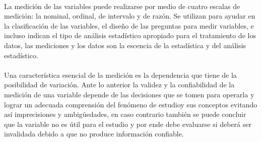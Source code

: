 \documentclass[12pt,hidelinks]{article}
\begin{document}
	\paragraph{}La medición de las variables puede realizarse por medio de cuatro escalas de medición: la nominal, ordinal, de intervalo y de razón. Se utilizan para ayudar en la clasificación de las variables, el diseño de las preguntas para medir variables, e incluso indican el tipo de análisis estadístico apropiado para el tratamiento de los datos, las mediciones y los datos son la escencia de la estadística y del análisis estadístico.
	\paragraph{}Una característica esencial de la medición es la dependencia que tiene de la posibilidad de variación. Ante lo anterior la validez y la confiabilidad de la medición de una variable depende de las decisiones que se tomen para operarla y lograr un adecuada comprensión del fenómeno de estudioy sus conceptos evitando así imprecisiones y ambigüedades, en caso  contrario también se puede concluir que la variable no es útil para el estudio y por ende debe evaluarse si deberá ser invalidada debido a que no produce información confiable.
\end{document}
